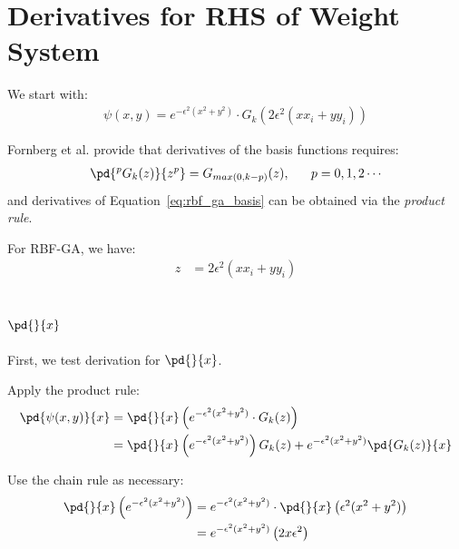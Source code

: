 \documentclass[11pt]{report}
\begin{document}
\tableofcontents
\fi

{ \graphicspath{{rbffd_methods_content/}}

\chapter{Derivatives for RHS of Weight System}
We start with:
\begin{align} 
\psi (x,y) = e^{-\epsilon^2(x^2+y^2)} \cdot G_k(2\epsilon^2(x x_i +y y_i)) \label{eq:rbf_ga_basis}
\end{align}

Fornberg et al. \cite{FornbergLehtoPowell12} provide that derivatives of the basis functions requires:
\begin{align}
\pd{^p G_k(z)}{z^p} = G_{max(0,k-p)} (z), \ \ \ \ \ p = 0, 1, 2 \cdots 
\end{align}
and derivatives of Equation~\ref{eq:rbf_ga_basis} can be obtained via the \emph{product rule}. 

For RBF-GA, we have: 
\begin{align}
z & = 2\epsilon^2(x x_i + y y_i) \label{eq:gamma_z}
\end{align}

\section{$\pd{}{x}$}

First, we test derivation for $\pd{}{x}$. 

Apply the product rule: 
\begin{align}
\pd{\psi(x,y)}{x} & = \pd{}{x} \left( e^{-\epsilon^2(x^2+y^2)} \cdot G_k(z)  \right) \nonumber \\
& = \pd{}{x}\left( e^{-\epsilon^2 (x^2 + y^2)} \right) G_k(z) + e^{-\epsilon^2(x^2 + y^2)} \pd{G_k(z)}{x} \label{eq:x_product_rule}
\end{align}

Use the chain rule as necessary:
\begin{align}
\pd{}{x}\left( e^{-\epsilon^2 (x^2 + y^2)} \right) & = e^{-\epsilon^2 (x^2 + y^2)} \cdot \pd{}{x} \left( \epsilon^2(x^2+y^2) \right) \nonumber \\
        & = e^{-\epsilon^2 (x^2 + y^2)} \left(2x \epsilon^2 \right) \label{eq:x_part1}
\end{align}


}
\end{document}
